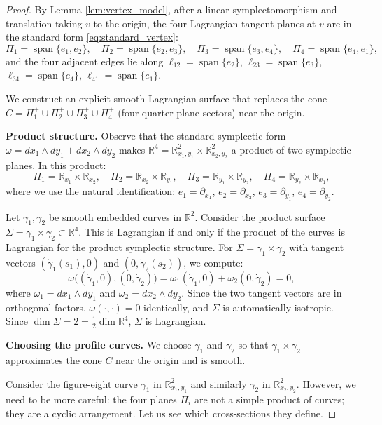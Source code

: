 \documentclass[12pt]{article}
\theoremstyle{definition}
\DeclareMathOperator{\Span}{span}
\begin{document}
\begin{proof}
By Lemma \ref{lem:vertex_model}, after a linear symplectomorphism and translation taking $v$ to the origin, the four Lagrangian tangent planes at $v$ are in the standard form \eqref{eq:standard_vertex}:
\[
  \Pi_1 = \Span\{e_1,e_2\},\quad \Pi_2 = \Span\{e_2,e_3\},\quad
  \Pi_3 = \Span\{e_3,e_4\},\quad \Pi_4 = \Span\{e_4,e_1\},
\]
and the four adjacent edges lie along $\ell_{12} = \Span\{e_2\}$, $\ell_{23}=\Span\{e_3\}$, $\ell_{34}=\Span\{e_4\}$, $\ell_{41}=\Span\{e_1\}$.

We construct an explicit smooth Lagrangian surface that replaces the cone $C = \Pi_1^+ \cup \Pi_2^+ \cup \Pi_3^+ \cup \Pi_4^+$ (four quarter-plane sectors) near the origin.

\medskip
\noindent\textbf{Product structure.} Observe that the standard symplectic form $\omega = dx_1\wedge dy_1 + dx_2\wedge dy_2$ makes $\mathbb{R}^4 = \mathbb{R}^2_{x_1,y_1} \times \mathbb{R}^2_{x_2,y_2}$ a product of two symplectic planes. In this product:
\[
  \Pi_1 = \mathbb{R}_{x_1} \times \mathbb{R}_{x_2},\quad
  \Pi_2 = \mathbb{R}_{x_2} \times \mathbb{R}_{y_1},\quad
  \Pi_3 = \mathbb{R}_{y_1} \times \mathbb{R}_{y_2},\quad
  \Pi_4 = \mathbb{R}_{y_2} \times \mathbb{R}_{x_1},
\]
where we use the natural identification: $e_1=\partial_{x_1}$, $e_2=\partial_{x_2}$, $e_3=\partial_{y_1}$, $e_4=\partial_{y_2}$.

Let $\gamma_1, \gamma_2$ be smooth embedded curves in $\mathbb{R}^2$. Consider the product surface $\Sigma = \gamma_1 \times \gamma_2 \subset \mathbb{R}^4$. This is Lagrangian if and only if the product of the curves is Lagrangian for the product symplectic structure. For $\Sigma = \gamma_1 \times \gamma_2$ with tangent vectors $(\dot\gamma_1(s_1), 0)$ and $(0, \dot\gamma_2(s_2))$, we compute:
\[
  \omega\bigl((\dot\gamma_1, 0), (0, \dot\gamma_2)\bigr)
  = \omega_1(\dot\gamma_1, 0) + \omega_2(0, \dot\gamma_2) = 0,
\]
where $\omega_1 = dx_1 \wedge dy_1$ and $\omega_2 = dx_2 \wedge dy_2$. Since the two tangent vectors are in orthogonal factors, $\omega(\cdot,\cdot) = 0$ identically, and $\Sigma$ is automatically isotropic. Since $\dim\Sigma = 2 = \frac{1}{2}\dim\mathbb{R}^4$, $\Sigma$ is Lagrangian.

\medskip
\noindent\textbf{Choosing the profile curves.} We choose $\gamma_1$ and $\gamma_2$ so that $\gamma_1 \times \gamma_2$ approximates the cone $C$ near the origin and is smooth.

Consider the figure-eight curve $\gamma_1$ in $\mathbb{R}^2_{x_1,y_1}$ and similarly $\gamma_2$ in $\mathbb{R}^2_{x_2,y_2}$. However, we need to be more careful: the four planes $\Pi_i$ are not a simple product of curves; they are a cyclic arrangement. Let us see which cross-sections they define.


\end{proof}
\end{document}
